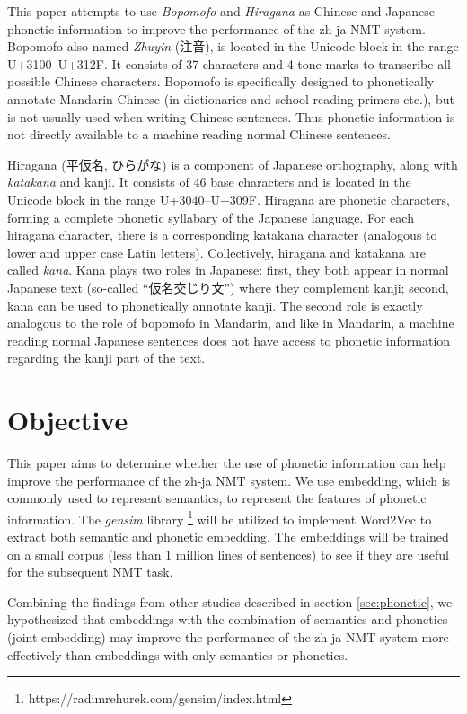 This paper attempts to use \textit{Bopomofo} and \textit{Hiragana} as Chinese and Japanese phonetic information to improve the performance of the zh-ja NMT system. Bopomofo also named \textit{Zhuyin} (注音), is located in the Unicode block in the range U+3100–U+312F. It consists of 37 characters and 4 tone marks to transcribe all possible Chinese characters. Bopomofo is specifically designed to phonetically annotate Mandarin Chinese (in dictionaries and school reading primers etc.), but is not usually used when writing Chinese sentences. Thus phonetic information is not directly available to a machine reading normal Chinese sentences.
\begin{CJK}{UTF8}{ipxm}
Hiragana (平仮名, ひらがな) is a component of Japanese orthography, along with \textit{katakana} and kanji. It consists of 46 base characters and is located in the Unicode block in the range U+3040–U+309F. Hiragana are phonetic characters, forming a complete phonetic syllabary of the Japanese language. For each hiragana character, there is a corresponding katakana character (analogous to lower and upper case Latin letters). Collectively, hiragana and katakana are called \textit{kana}. Kana plays two roles in Japanese: first, they both appear in normal Japanese text (so-called ``仮名交じり文'') where they complement kanji; second, kana can be used to phonetically annotate kanji. The second role is exactly analogous to the role of bopomofo in Mandarin, and like in Mandarin, a machine reading normal Japanese sentences does not have access to phonetic information regarding the kanji part of the text.
\end{CJK}


\section{Objective} \label{sec:objective}

This paper aims to determine whether the use of phonetic information can help improve the performance of the zh-ja NMT system. We use embedding, which is commonly used to represent semantics, to represent the features of phonetic information. The \textit{gensim} library \footnote{https://radimrehurek.com/gensim/index.html} will be utilized to implement Word2Vec \cite{mikolov2013efficient} to extract both semantic and phonetic embedding. The embeddings will be trained on a small corpus (less than 1 million lines of sentences) to see if they are useful for the subsequent NMT task.

Combining the findings from other studies \cite{liu-etal-2019-robust, khan2019diversity} described in section \ref{sec:phonetic}, we hypothesized that embeddings with the combination of semantics and phonetics (joint embedding) may improve the performance of the zh-ja NMT system more effectively than embeddings with only semantics or phonetics. 

